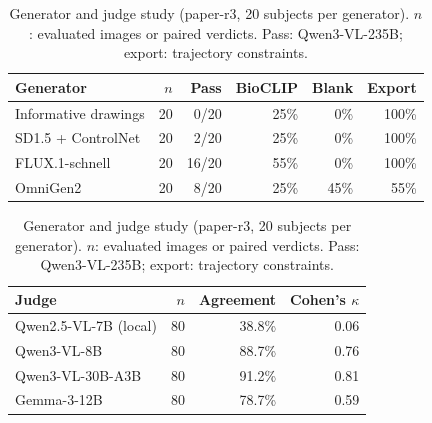 \begin{table}[t]
\centering
\caption{Generator and judge study (paper-r3, 20 subjects per generator). $n$: evaluated images or paired verdicts. Pass: Qwen3-VL-235B; export: trajectory constraints.}
\label{tab:judge}
\setlength{\tabcolsep}{2.6pt}
\begin{tabular}{lrrrrr}
\toprule
Generator & $n$ & Pass & BioCLIP & Blank & Export \\
\midrule
Informative drawings & 20 & 0/20 & 25\% & 0\% & 100\% \\
SD1.5 + ControlNet & 20 & 2/20 & 25\% & 0\% & 100\% \\
FLUX.1-schnell & 20 & 16/20 & 55\% & 0\% & 100\% \\
OmniGen2 & 20 & 8/20 & 25\% & 45\% & 55\% \\
\bottomrule
\end{tabular}
\vspace{3pt}
\begin{tabular}{lrrr}
\toprule
Judge & $n$ & Agreement & Cohen's $\kappa$ \\
\midrule
Qwen2.5-VL-7B (local) & 80 & 38.8\% & 0.06 \\
Qwen3-VL-8B & 80 & 88.7\% & 0.76 \\
Qwen3-VL-30B-A3B & 80 & 91.2\% & 0.81 \\
Gemma-3-12B & 80 & 78.7\% & 0.59 \\
\bottomrule
\end{tabular}
\end{table}
